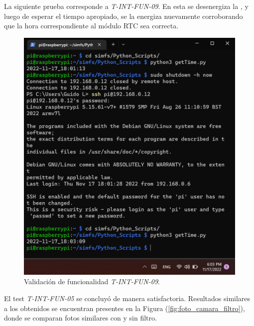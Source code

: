 La siguiente prueba corresponde a \textit{T-INT-FUN-09}. En esta se desenergiza la \rspi, y luego de esperar el tiempo apropiado, se la energiza nuevamente corroborando que la hora correspondiente al módulo RTC sea correcta.
\begin{figure}[H]
\centering
	\includegraphics[width=0.8\linewidth]{ImagenesValidacion del prototipo/TINTFUN9}
	\caption{Validación de funcionalidad \textit{T-INT-FUN-09}.}
\end{figure}

El test \textit{T-INT-FUN-05} se concluyó de manera satisfactoria. Resultados similares a los obtenidos se encuentran presentes en la Figura (\ref{fig:foto_camara_filtro}), donde se comparan fotos similares con y sin filtro.

